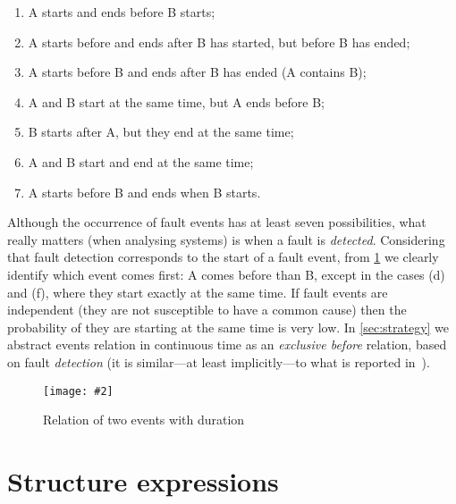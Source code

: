 \documentclass[en,twoside,onehalfspacing,phd]{risethesis}
\newcommand{\includegraphicsaspectratio}[2][1]{%
  \texttt{[image: \#2]}%
}
\begin{document}
\begin{enumerate}\renewcommand{\theenumi}{\alph{enumi}}
  \item A starts and ends before B starts;
  \item A starts before and ends after B has started, but before B has ended;
  \item A starts before B and ends after B has ended (A contains B);
  \item A and B start at the same time, but A ends before B;
  \item B starts after A, but they end at the same time;
  \item A and B start and end at the same time;
  \item A starts before B and ends when B starts.
\end{enumerate}

Although the occurrence of fault events has at least seven possibilities, what really matters (when analysing systems) is when a fault is \emph{detected}.
Considering that fault detection corresponds to the start of a fault event, from \cref{fig:time-relations} we clearly identify which event comes first: A comes before than B, except in the cases (d) and (f), where they start exactly at the same time.
If fault events are independent (they are not susceptible to have a common cause) then the probability of they are starting at the same time is very low.
In \cref{sec:strategy} we abstract events relation in continuous time as an \emph{exclusive before} relation, based on fault \emph{detection} (it is similar---at least implicitly---to what is reported in~\cite{WP2009,MRL2011}).


\begin{figure}[t]
  \centering
  \includegraphicsaspectratio[0.6]{time-relations}
  \caption{Relation of two events with duration}
  \label{fig:time-relations}
\end{figure}

\section{Structure expressions}
\label{sec:structure-expressions}
\end{document}
